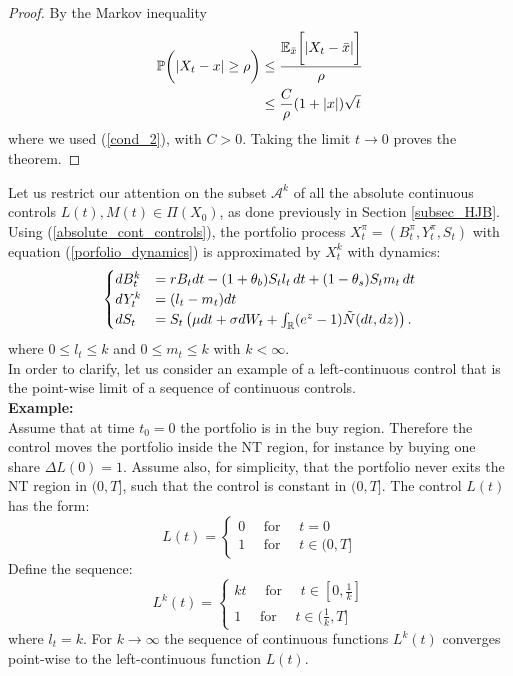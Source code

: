 \begin{proof}
By the Markov inequality
 \begin{align*}
  \mathbb{P} \biggl( | X_t - x | \geq \rho \biggr) & \leq \frac{\mathbb{E}_{\bar x}\biggl[ |X_t - \bar x| \biggr]}{\rho} \\
   & \leq \frac{C}{\rho} (1+|x|)\sqrt{t}
 \end{align*}
 where we used (\ref{cond_2}), with $C>0$. Taking the limit $t\to 0$ proves the theorem.
\end{proof}
   
Let us restrict our attention on the subset $\mathcal{A}^k$ of all the absolute continuous controls $L(t), M(t) \in \Pi(X_0)$, as done previously in Section
\ref{subsec_HJB}. 
Using (\ref{absolute_cont_controls}), the portfolio process $X^{\pi}_t=(B^{\pi}_t, Y^{\pi}_t, S_t)$ with equation (\ref{porfolio_dynamics}) is approximated by $X^k_t$ with dynamics:
\begin{equation}\label{porfolio_dynamics3}
 \begin{cases}
 dB^{k}_t &=  rB_t dt - (1+\theta_b)S_t l_t\, dt + (1-\theta_s) S_t m_t\, dt \\
 dY^{k}_t &=  (l_t - m_t)dt \\
 dS_t &=  S_t \left( \mu dt + \sigma dW_t + \int_{\mathbb{R}} (e^z-1) \tilde N(dt,dz) \right).
\end{cases}
\end{equation} 
where $0 \leq l_t \leq k$ and $0 \leq m_t \leq k$ with $k<\infty$.\\
In order to clarify, let us consider an example of a left-continuous control that is the point-wise limit of a sequence of continuous controls.\\ 
\textbf{Example:}\\
Assume that at time $t_0=0$ the portfolio is in the buy region. Therefore the control moves the portfolio inside the NT region, for instance by buying one share $\Delta L(0) = 1$. 
Assume also, for simplicity, that the portfolio never exits
the NT region in $(0,T]$, such that the control is constant in $(0,T]$. The control $L(t)$ has the form:
\begin{equation}
L(t) = 
 \begin{cases}
  0 \quad \mbox{ for } \quad t = 0\\  
  1 \quad \mbox{ for } \quad t \in (0,T]
 \end{cases}
\end{equation}
Define the sequence:
\begin{equation}
L^k(t) = 
 \begin{cases}
  k t \quad \mbox{ for } \quad t \in [0,\frac{1}{k}] \\  
  1 \quad \mbox{ for } \quad t \in (\frac{1}{k},T]
 \end{cases}
\end{equation}
where $l_t = k$.
For $k\to \infty$ the sequence of continuous functions $L^k(t)$ converges point-wise to the left-continuous function $L(t)$.\\

